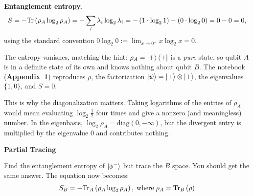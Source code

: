 \documentclass[a4paper, 10pt]{article}
\begin{document}
\begin{solution}
	\noindent \textbf{Entanglement entropy.}
	\[
		S = -\mathrm{Tr}\left(\rho_A \log_2 \rho_A\right)
		= -\sum_i \lambda_i \log_2 \lambda_i
		= -\left(1 \cdot \log_2 1\right) - \left(0 \cdot \log_2 0\right)
		= 0 - 0 = 0,
	\]
	using the standard convention \( 0 \log_2 0 := \lim_{x \to 0^{+}} x \log_2 x = 0 \).

	\noindent The entropy vanishes, matching the hint: \( \rho_A = \ket{+}\bra{+} \) is a \emph{pure} state, so qubit \( A \) is in a definite state of its own and knows nothing about qubit \( B \).
	The notebook (\textbf{Appendix~1}) reproduces \( \rho \), the factorization \( \ket{\psi} = \ket{+} \otimes \ket{+} \), the eigenvalues \( \{1, 0\} \), and \( S = 0 \).

	\begin{remark}
		This is why the diagonalization matters. Taking logarithms of the entries of \( \rho_A \) would mean evaluating \( \log_2 \tfrac{1}{2} \) four times and give a nonzero (and meaningless) number.
		In the eigenbasis, \( \log_2 \rho_A = \mathrm{diag}(0, -\infty) \), but the divergent entry is multiplied by the eigenvalue \( 0 \) and contributes nothing.
	\end{remark}
\end{solution}

\newpage

\begin{problem}
\textbf{Partial Tracing}
\par Find the entanglement entropy of \( \ket{\phi^-} \) but trace the \( B \) space.
You should get the same answer. The equation now becomes:
\[
	S_B = - \mathrm{Tr}_A \left( \rho_A \log_2 \rho_A \right), \; \text{where} \; \rho_A = \mathrm{Tr}_B \left(\rho\right)
\]
\end{problem}
\end{document}

